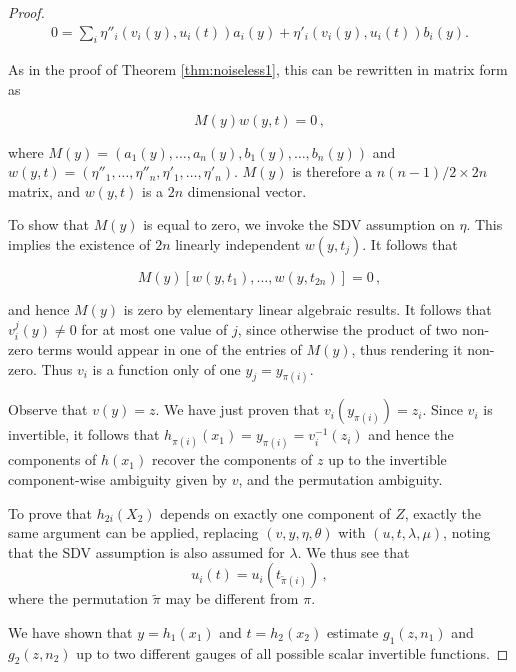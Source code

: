 \begin{proof}
	\begin{align*}
	0 = \sum_{i} \eta''_{i}(v_{i}({y}),u_{i}({t})){a}_i({y}) + \eta'_{i}(v_{i}({y}), u_{i}({t})){b}_i({y}).
	\end{align*}
	
	As in the proof of Theorem \ref{thm:noiseless1}, this can be rewritten in matrix form as
	
	\begin{equation}
	\label{eq:matrixmult}
	{M}({y}){w}({y}, {t})=0\,,
	\end{equation}
	
	where ${M}({y}) = ({a}_1({y}), \ldots,  {a}_n({y}), {b}_1({y}), \ldots, {b}_n({y})) $ and ${w}({y}, {t}) = (\eta''_{1}, \ldots, \eta''_{n}, \eta'_{1}, \ldots,\eta'_{n})$. ${M}({y})$ is therefore a $n(n-1)/2 \times 2n$ matrix, and ${w}({y}, {t})$ is a $2n$ dimensional vector.
	
	To show that ${M}({y})$ is equal to zero, we invoke the SDV assumption on ${\eta}$.
	This implies the existence of $2n$ linearly independent ${w}({y}, {t}_j)$.
	It follows that
	
	\[
	{M}({y})[{w}({y}, {t}_1), \ldots, {w}({y}, {t}_{2n})]=0\,,
	\]
	
	and hence ${M}({y})$ is zero by elementary linear algebraic results.
	It follows that $v_i^j({y})\not=0$ for at most one value of $j$, since otherwise the product of two non-zero terms would appear in one of the entries of ${M}({y})$, thus rendering it non-zero.
	Thus $v_i$ is a function only of one $y_j = y_{\pi(i)}$.
	
	Observe that ${v}({y}) = {z}$.
	We have just proven that $v_i(y_{\pi(i)}) = z_i$.
	Since $v_i$ is invertible, it follows that $h_{\pi(i)}({x}_{1}) = y_{\pi(i)} = v_i^{-1}(z_i)$ and hence the components of ${h}({x}_{1})$ recover the components of ${z}$ up to the invertible component-wise ambiguity given by ${v}$, and the permutation ambiguity.
	
To prove that $h_{2i}(X_2)$ depends on exactly one component of $Z$, exactly the same argument can be applied, replacing $({v},{y}, {\eta}, {\theta})$ with $({u},{t}, {\lambda}, {\mu})$, noting that the SDV assumption is also assumed for ${\lambda}$.
We thus see that 
	\begin{equation}
	\label{eq:u_onev}
	u_{i}({t})  = u_{i}(t_{\tilde{\pi}(i)})\,,
	\end{equation}
	where the permutation $\tilde{\pi}$ may be different from $\pi$.


We have shown that ${y}={h}_1({x}_1)$ and ${t}={h}_2({x}_2)$ estimate ${g}_1({z}, {n}_1)$ and ${g}_2({z}, {n}_2)$ up to two different gauges of all possible scalar invertible functions.
	

\end{proof}
